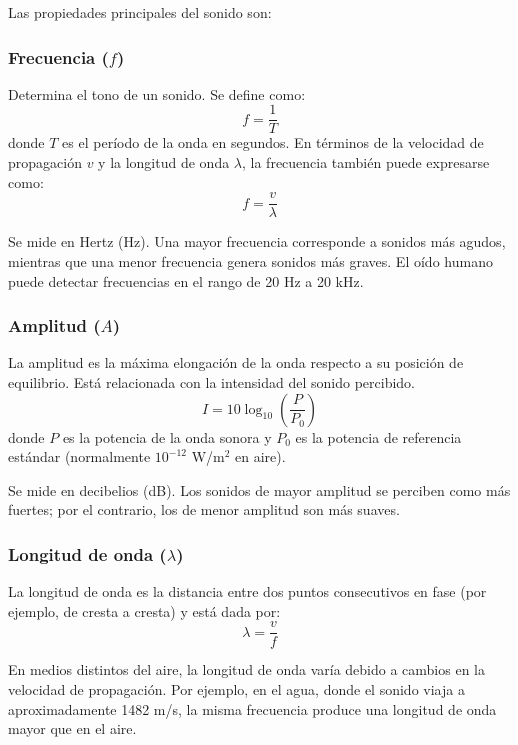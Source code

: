 Las propiedades principales del sonido son:

\subsubsection{Frecuencia ($f$)}
Determina el tono de un sonido. Se define como:
\begin{equation}
    f = \frac{1}{T}
\end{equation}
donde $T$ es el período de la onda en segundos. En términos de la velocidad de propagación $v$ y la longitud de onda $\lambda$, la frecuencia también puede expresarse como:
\begin{equation}
    f = \frac{v}{\lambda}
\end{equation}

Se mide en Hertz (Hz). Una mayor frecuencia corresponde a sonidos más agudos, mientras que una menor frecuencia genera sonidos más graves. El oído humano puede detectar frecuencias en el rango de 20 Hz a 20 kHz.

\subsubsection{Amplitud ($A$)}
La amplitud es la máxima elongación de la onda respecto a su posición de equilibrio. Está relacionada con la intensidad del sonido percibido.
\begin{equation}
    I = 10 \log_{10} \left( \frac{P}{P_0} \right)
\end{equation}
donde $P$ es la potencia de la onda sonora y $P_0$ es la potencia de referencia estándar (normalmente $10^{-12}$ W/m$^2$ en aire).

Se mide en decibelios (dB). Los sonidos de mayor amplitud se perciben como más fuertes; por el contrario, los de menor amplitud son más suaves.

\subsubsection{Longitud de onda ($\lambda$)}
La longitud de onda es la distancia entre dos puntos consecutivos en fase (por ejemplo, de cresta a cresta) y está dada por:
\begin{equation}
    \lambda = \frac{v}{f}
\end{equation}

En medios distintos del aire, la longitud de onda varía debido a cambios en la velocidad de propagación. Por ejemplo, en el agua, donde el sonido viaja a aproximadamente 1482 m/s, la misma frecuencia produce una longitud de onda mayor que en el aire.

